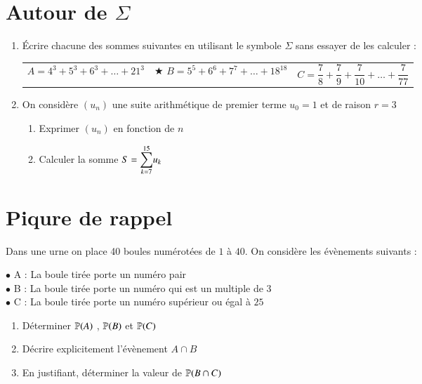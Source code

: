 \documentclass[oneside,12pt]{exam}          %
\begin{document}
\newpage
{}



\section{Autour de $\Sigma$}
\begin{enumerate}[itemsep = 0pt]
	\item Écrire chacune des sommes suivantes en utilisant le symbole $\Sigma$ sans essayer de les calculer :

	\begin{tabular}{p{} p{} p{}}
		$A = 4^3 + 5^3 + 6^3 + \ldots + 21^3$ &
		$\bigstar$ $B = 5^5 + 6^6 + 7^7 + \ldots + 18^{18}$ &
		$C = \dfrac{7}{8} + \dfrac{7}{9} + \dfrac{7}{10} + \ldots + \dfrac{7}{77}$
	\end{tabular}
	
	\item On considère $(u_n)$ une suite arithmétique de premier terme $u_0 = 1$ et de raison $r = 3$
	\begin{enumerate}
		\item Exprimer $(u_n)$ en fonction de $n$
		\item Calculer la somme $S = {\displaystyle\sum_{k=7}^{15}} u_k$
	\end{enumerate}
\end{enumerate}



\section{Piqure de rappel}
Dans une urne on place 40 boules numérotées de $1$ à $40$. On considère les évènements suivants :

$\bullet$ A : \og La boule tirée porte un numéro pair \fg \\
$\bullet$ B : \og La boule tirée porte un numéro qui est un multiple de 3\fg \\
$\bullet$ C : \og La boule tirée porte un numéro supérieur ou égal à $25$ \fg
\begin{enumerate}[itemsep = 0pt]
	\item Déterminer ${\mathbb P}(A)$ , ${\mathbb P}(B)$ et ${\mathbb P}(C)$
	\item Décrire explicitement l'évènement $A \cap B$
	\item En justifiant, déterminer la valeur de ${\mathbb P}(B \cap C)$
\end{enumerate}
\end{document}
